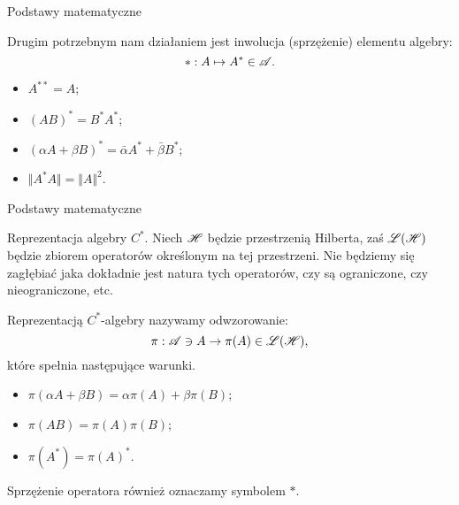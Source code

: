 \documentclass[10pt,t]{beamer}
\begin{document}
\begin{frame}{Podstawy matematyczne}


  Drugim potrzebnym nam działaniem jest inwolucja (sprzężenie) elementu
  algebry:
  \begin{equation}
    \label{eq:2}
    * : A \mapsto A^{ * } \in \mathcal{A}.
  \end{equation}

  \begin{itemize}
    \RaggedRight

  \item $A^{ ** } = A$;

  \item $( A B )^{ * } = B^{ * } A^{ * }$;

  \item $( \alpha A + \beta B )^{ * } = \bar{ \alpha } A^{ * } + \bar{ \beta } B^{ * }$;

  \item $\Vert A^{ * } A \Vert = \Vert A \Vert^{ 2 }$.

  \end{itemize}

\end{frame}





\begin{frame}{Podstawy matematyczne}


  Reprezentacja algebry $C^{ * }$. Niech $\mathcal{H}$ będzie przestrzenią
  Hilberta, zaś $\mathcal{L}( \mathcal{H} )$ będzie zbiorem operatorów określonym na tej przestrzeni. Nie będziemy się zagłębiać jaka dokładnie jest natura tych operatorów, czy są ograniczone, czy nieograniczone, etc.

  Reprezentacją $C^{ * }$-algebry nazywamy odwzorowanie:
  \begin{equation}
    \label{eq:3}
    \pi : \mathcal{A} \ni A \rightarrow \pi( A ) \in \mathcal{L}( \mathcal{H} ),
  \end{equation}
  które spełnia następujące warunki.
  \begin{itemize}
    \RaggedRight

  \item $\pi( \alpha A + \beta B ) = \alpha \pi( A ) + \beta \pi( B )$;

  \item $\pi( A B ) = \pi( A ) \pi( B )$;

  \item $\pi( A^{ * } ) = \pi( A )^{ * }$.

  \end{itemize}
  Sprzężenie operatora również oznaczamy symbolem $*$.

\end{frame}
\end{document}
